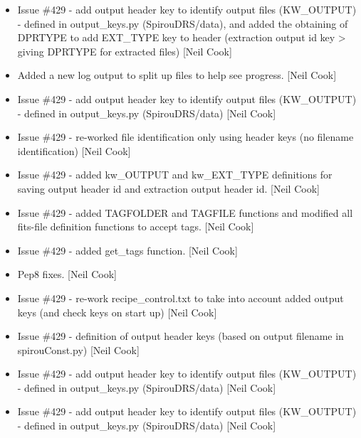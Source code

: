 \documentclass[a4paper,10pt,english]{report}
\begin{document}
\label{\detokenize{misc/changelog:id334}}\begin{itemize}
\item {} 
Issue \#429 - add output header key to identify output files
(KW\_OUTPUT) - defined in output\_keys.py (SpirouDRS/data), and added
the obtaining of DPRTYPE to add  EXT\_TYPE key to header (extraction
output id key \textendash{}\textgreater{} giving DPRTYPE for extracted files) {[}Neil Cook{]}

\item {} 
Added a new log output to split up files to help see progress. {[}Neil
Cook{]}

\item {} 
Issue \#429 - add output header key to identify output files
(KW\_OUTPUT) - defined in output\_keys.py (SpirouDRS/data) {[}Neil Cook{]}

\item {} 
Issue \#429 - re-worked file identification only using header keys (no
filename identification) {[}Neil Cook{]}

\item {} 
Issue \#429 - added kw\_OUTPUT and kw\_EXT\_TYPE definitions for saving
output header id and extraction output header id. {[}Neil Cook{]}

\item {} 
Issue \#429 - added TAGFOLDER and TAGFILE functions and modified all
fits-file definition functions to accept tags. {[}Neil Cook{]}

\item {} 
Issue \#429 - added get\_tags function. {[}Neil Cook{]}

\item {} 
Pep8 fixes. {[}Neil Cook{]}

\item {} 
Issue \#429 - re-work recipe\_control.txt to take into account added
output keys (and check keys on start up) {[}Neil Cook{]}

\item {} 
Issue \#429 - definition of output header keys (based on output
filename in spirouConst.py) {[}Neil Cook{]}

\item {} 
Issue \#429 - add output header key to identify output files
(KW\_OUTPUT) - defined in output\_keys.py (SpirouDRS/data) {[}Neil Cook{]}

\item {} 
Issue \#429 - add output header key to identify output files
(KW\_OUTPUT) - defined in output\_keys.py (SpirouDRS/data) {[}Neil Cook{]}


\end{itemize}
\end{document}
